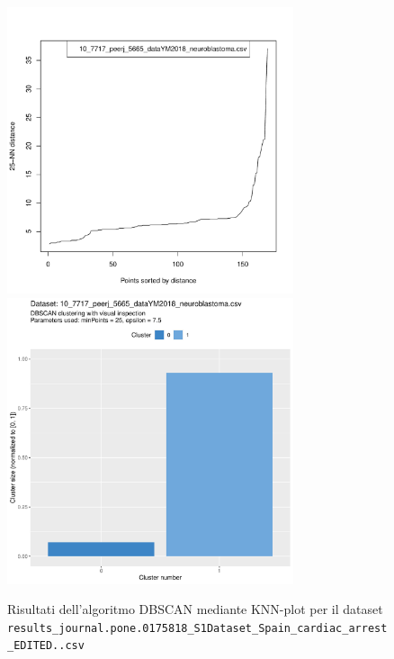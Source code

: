 \documentclass[12pt]{report}
\begin{document}
			\begin{figure}[h]
				\centering
				\includegraphics[width = 0.75\textwidth, height = 0.45\textheight, page = 2]{
					doc/DBSCAN_optimal_MinPts.pdf
				}
				\includegraphics[width = 0.75\textwidth, height = 0.45\textheight, page = 2]{
					results/DBSCAN_visual_comparison.pdf
				}
				\caption{Risultati dell'algoritmo DBSCAN mediante KNN-plot per il dataset
				\texttt{results\_journal.pone.0175818\_S1Dataset\_Spain\_cardiac\_arrest\_EDITED..csv}}
				\label{fig:dbscan-extra2}
			\end{figure}
\end{document}
